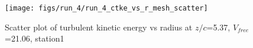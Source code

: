 \begin{figure}[H]
\centering
\texttt{[image: figs/run\_4/run\_4\_ctke\_vs\_r\_mesh\_scatter]}
\caption{Scatter plot of turbulent kinetic energy vs radius at $z/c$=5.37, $V_{free}$=21.06, station1}
\label{fig:run_4_ctke_vs_r_mesh_scatter}
\end{figure}


